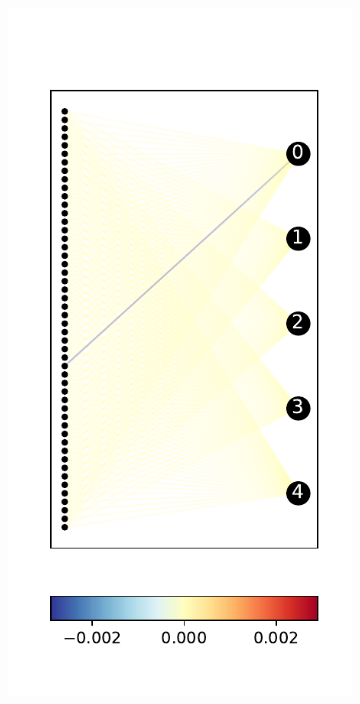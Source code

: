 \documentclass{easychair}
\begin{document}
\begin{figure}
\begin{subfigure}{0.2\linewidth}
  \includegraphics[width=\linewidth]{./images/ACASXU_2_9_1_vals.pdf}
\end{subfigure}
\begin{subfigure}{0.2\linewidth}

\end{subfigure}
\end{figure}
\end{document}
